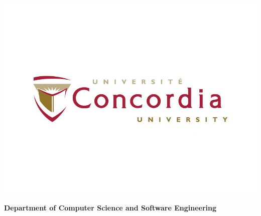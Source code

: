 \begin{titlepage}
\begin{center}
     

\includegraphics[width=0.45\linewidth]{METRICSTICS/media/Concordia-university-logo.jpg}

    

    {\large \textbf{Department of Computer Science and Software Engineering}\par}
    \vspace{0.4cm}
    
\end{center}
\vfill %
\clearpage
\end{titlepage}
